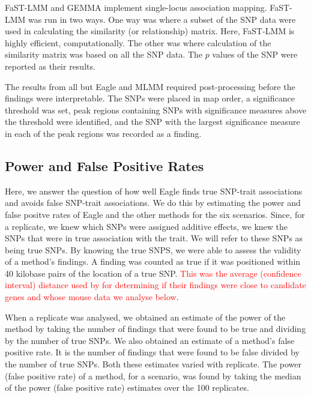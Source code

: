 \documentclass{article}
\begin{document}
FaST-LMM and GEMMA implement single-locus association mapping. FaST-LMM was run in two ways. One way was where a subset of the SNP data were used in calculating the similarity (or relationship) matrix. Here, FaST-LMM is highly efficient, computationally. The other was where calculation of the similarity matrix was based on all the SNP data. The $p$ values of the SNP were reported as their results. 


The results from all but Eagle and MLMM required post-processing before the findings were interpretable.  The SNPs were placed in map order, 
a significance threshold was set, peak regions containing SNPs with significance measures above the threshold were identified, and the SNP with the largest 
significance measure in each of the peak regions was recorded as a finding. 


 



\subsection{Power and False Positive Rates}

Here, we answer the question of how well Eagle finds true SNP-trait associations and avoids false SNP-trait associations. We do this by estimating the power and false positve rates of Eagle and the other methods for the six scenarios.  Since, for a replicate, we knew which SNPs were assigned additive effects, we knew the SNPs that were in true association with the trait. We will refer to these SNPs as being
true SNPs. By knowing the true SNPS, we were able to assess the validity of a method's findings. A  finding was counted as true if it was positioned within 40 kilobase pairs of the location of a true SNP.  \textcolor{red}{This was the average (confidence interval) distance used by
\cite{nicod2016genome} for determining if their findings were close to candidate genes and whose mouse data we analyse below}. 

When a replicate was analysed, we obtained an estimate of the power of the method by taking  the number of findings that were found to be  true and dividing by the 
number of true SNPs. We also obtained an estimate of a method's false positive rate. It is the number of findings that were found to be false divided by the number of true SNPs.  Both these estimates varied with replicate. 
The power (false positive rate) of a method, for a scenario, was found by taking the median of the power (false positive rate) estimates over the 100 replicates. 
\end{document}
